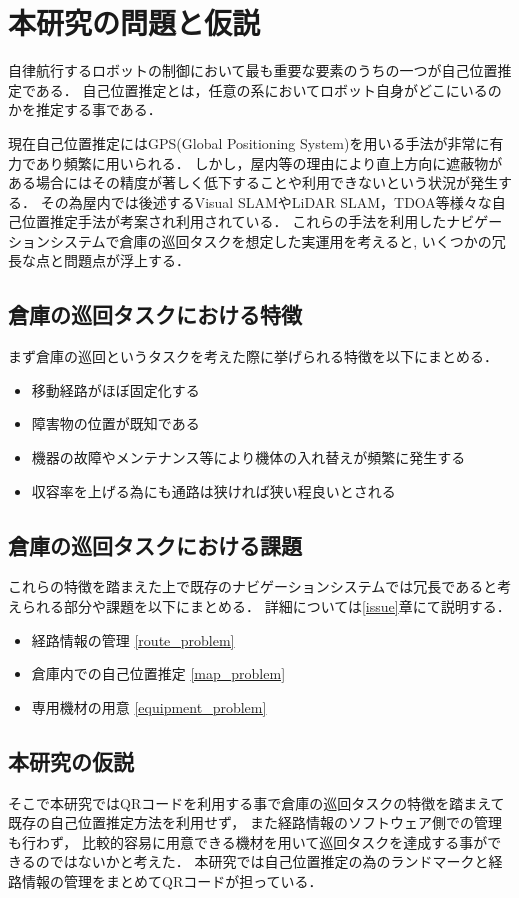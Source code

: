 \section{本研究の問題と仮説}
自律航行するロボットの制御において最も重要な要素のうちの一つが自己位置推定である．
自己位置推定とは，任意の系においてロボット自身がどこにいるのかを推定する事である．

現在自己位置推定にはGPS(Global Positioning System)を用いる手法が非常に有力であり頻繁に用いられる．
しかし，屋内等の理由により直上方向に遮蔽物がある場合にはその精度が著しく低下することや利用できないという状況が発生する．
その為屋内では後述するVisual SLAMやLiDAR SLAM，TDOA等様々な自己位置推定手法が考案され利用されている．
これらの手法を利用したナビゲーションシステムで倉庫の巡回タスクを想定した実運用を考えると,
いくつかの冗長な点と問題点が浮上する．

\subsection{倉庫の巡回タスクにおける特徴}
まず倉庫の巡回というタスクを考えた際に挙げられる特徴を以下にまとめる．
\begin{itemize}
    \item 移動経路がほぼ固定化する
    \item 障害物の位置が既知である
    \item 機器の故障やメンテナンス等により機体の入れ替えが頻繁に発生する
    \item 収容率を上げる為にも通路は狭ければ狭い程良いとされる
\end{itemize}

\subsection{倉庫の巡回タスクにおける課題}
これらの特徴を踏まえた上で既存のナビゲーションシステムでは冗長であると考えられる部分や課題を以下にまとめる．
詳細については\ref{issue}章にて説明する．
\begin{itemize}
    \item 経路情報の管理 \ref{route_problem}
    \item 倉庫内での自己位置推定 \ref{map_problem}
    \item 専用機材の用意 \ref{equipment_problem}
\end{itemize}

\subsection{本研究の仮説}
そこで本研究ではQRコードを利用する事で倉庫の巡回タスクの特徴を踏まえて既存の自己位置推定方法を利用せず，
また経路情報のソフトウェア側での管理も行わず，
比較的容易に用意できる機材を用いて巡回タスクを達成する事ができるのではないかと考えた．
本研究では自己位置推定の為のランドマークと経路情報の管理をまとめてQRコードが担っている．